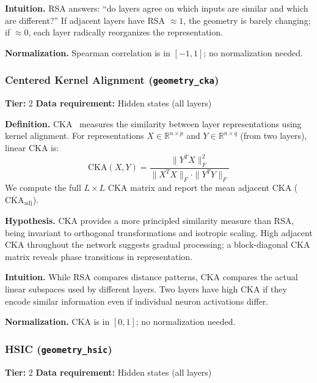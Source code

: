 \documentclass[preprint]{neurips_2025}
\begin{document}
\textbf{Intuition.}
RSA answers: ``do layers agree on which inputs are similar and which are different?'' If adjacent layers have RSA $\approx 1$, the geometry is barely changing; if $\approx 0$, each layer radically reorganizes the representation.

\textbf{Normalization.} Spearman correlation is in $[-1, 1]$; no normalization needed.

\subsubsection{Centered Kernel Alignment (\texttt{geometry\_cka})}
\label{app:cka}

\textbf{Tier:} 2 \quad \textbf{Data requirement:} Hidden states (all layers)

\textbf{Definition.}
CKA~\citep{kornblith2019similarity} measures the similarity between layer representations using kernel alignment. For representations $X \in \mathbb{R}^{n \times p}$ and $Y \in \mathbb{R}^{n \times q}$ (from two layers), linear CKA is:
\begin{equation}
  \text{CKA}(X, Y) = \frac{\|Y^T X\|_F^2}{\|X^T X\|_F \cdot \|Y^T Y\|_F}
\end{equation}
We compute the full $L \times L$ CKA matrix and report the mean adjacent CKA ($\overline{\text{CKA}}_{\text{adj}}$).

\textbf{Hypothesis.}
CKA provides a more principled similarity measure than RSA, being invariant to orthogonal transformations and isotropic scaling. High adjacent CKA throughout the network suggests gradual processing; a block-diagonal CKA matrix reveals phase transitions in representation.

\textbf{Intuition.}
While RSA compares distance patterns, CKA compares the actual linear subspaces used by different layers. Two layers have high CKA if they encode similar information even if individual neuron activations differ.

\textbf{Normalization.} CKA is in $[0, 1]$; no normalization needed.

\subsubsection{HSIC (\texttt{geometry\_hsic})}
\label{app:hsic}

\textbf{Tier:} 2 \quad \textbf{Data requirement:} Hidden states (all layers)
\end{document}
